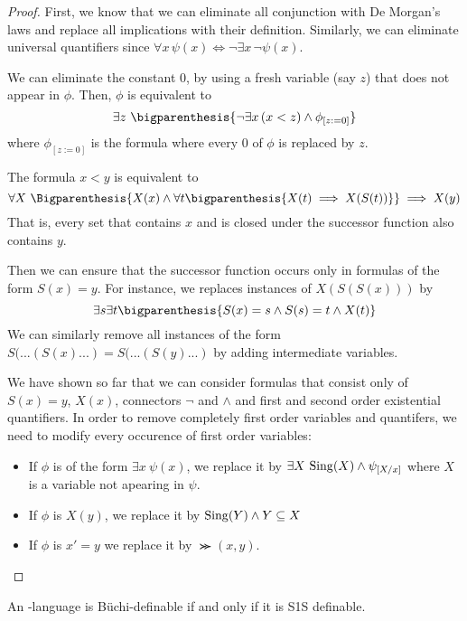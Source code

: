 \begin{proof}
    First, we know that we can eliminate all conjunction with De Morgan's
    laws and replace all implications with their definition. Similarly, we can eliminate universal quantifiers
    since $\forall x\, \psi(x) \iff \neg \exists x\, \neg \psi(x)$.

    We can eliminate the constant $0$, by using a fresh variable (say $z$)
    that does not appear in $\phi$. Then, $\phi$ is equivalent to
    \[
        \exists z~ \bigparenthesis{\neg\exists x\, (x < z) \wedge \phi_{[z:=0]}}
    \]
    where $\phi_{[z := 0]}$ is the formula where every 0 of $\phi$ is replaced by $z$.

    The formula $x < y$ is equivalent to \[
        \forall X~ \Bigparenthesis{
            X(x) \wedge \forall t \bigparenthesis{X(t) \implies X(S(t))}
        } \implies X(y)
    \]
    That is, every set that contains $x$ and is closed under the successor
    function also contains $y$.

    Then we can ensure that the successor function occurs only
    in formulas of the form $S(x) = y$. For instance,
    we replaces instances of $X(S(S(x)))$ by \[
        \exists s \exists t \bigparenthesis{
            S(x) = s \wedge S(s) = t \wedge X(t)
        }
    \]
    We can similarly remove all instances of the form $S(...(S(x)...) = S(...(S(y)...)$
    by adding intermediate variables.

    We have shown so far that we can consider formulas
    that consist only of $S(x) = y$, $X(x)$, connectors $\neg$ and $\wedge$
    and first and second order existential quantifiers.
    In order to remove completely first order variables and quantifers,
    we need to modify every occurence of first order variables:
    \begin{itemize}
        \item If $\phi$ is of the form $\exists x~ \psi(x)$, we replace it by
            $\exists X ~ \mathrm{Sing}(X) \wedge \psi_{[X/x]}$ where $X$ is a variable not apearing
            in $\psi$.
        \item If $\phi$ is $X(y)$, we replace it by $\mathrm{Sing}(Y) \wedge Y \subseteq X$
        \item If $\phi$ is $x' = y$ we replace it by $\Succ(x, y)$.
    \end{itemize}
\end{proof}

\begin{theorem}
    \label{thm:buchi-iff-s1s}
    An \w-language is Büchi-definable if and only if
    it is S1S definable.
\end{theorem}

